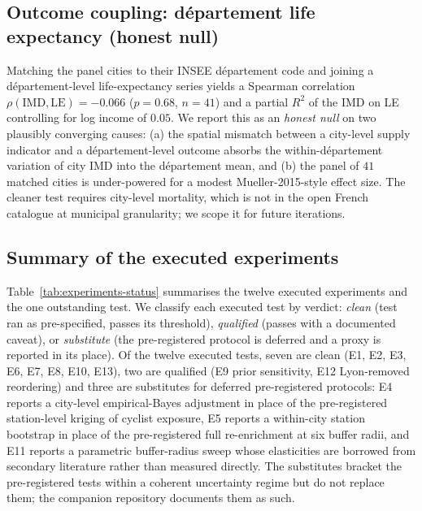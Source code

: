 \documentclass[11pt,a4paper]{article}
\newcommand{\IMD}{\mathrm{IMD}}
\begin{document}
\subsection{Outcome coupling: département life expectancy (honest null)}
\label{sec:val-life-exp}

Matching the panel cities to their INSEE département code and
joining a département-level life-expectancy series yields a
Spearman correlation $\rho(\IMD, \text{LE}) = -0.066$ ($p = 0.68$,
$n = 41$) and a partial $R^{2}$ of the IMD on LE controlling for
log income of $0.05$. We report this as an \emph{honest null} on
two plausibly converging causes: (a) the spatial mismatch between
a city-level supply indicator and a département-level outcome
absorbs the within-département variation of city IMD into the
département mean, and (b) the panel of $41$ matched cities is
under-powered for a modest Mueller-2015-style effect size. The
cleaner test requires city-level mortality, which is not in the
open French catalogue at municipal granularity; we scope it for
future iterations.

\subsection{Summary of the executed experiments}
\label{sec:val-summary}

Table~\ref{tab:experiments-status} summarises the twelve
executed experiments and the one outstanding test. We classify
each executed test by verdict: \emph{clean} (test ran as
pre-specified, passes its threshold), \emph{qualified} (passes
with a documented caveat), or \emph{substitute} (the
pre-registered protocol is deferred and a proxy is reported in
its place). Of the twelve executed tests, seven are clean
(E1, E2, E3, E6, E7, E8, E10, E13), two are qualified (E9 prior
sensitivity, E12 Lyon-removed reordering) and three are
substitutes for deferred pre-registered protocols: E4 reports a
city-level empirical-Bayes adjustment in place of the
pre-registered station-level kriging of cyclist exposure, E5
reports a within-city station bootstrap in place of the
pre-registered full re-enrichment at six buffer radii, and E11
reports a parametric buffer-radius sweep whose elasticities are
borrowed from secondary literature rather than measured
directly. The substitutes bracket the pre-registered tests
within a coherent uncertainty regime but do not replace them; the
companion repository documents them as such.
\end{document}
